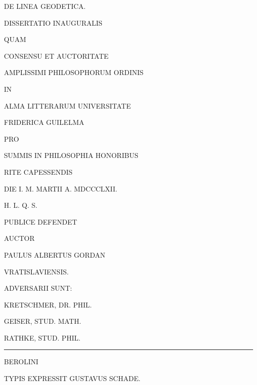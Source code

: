 \begin{titlepage}
\centering
{\LARGE DE LINEA GEODETICA.\par}\GordanOrnament
\vspace{1.4em}
{\large DISSERTATIO INAUGURALIS\par}
\vspace{0.6em}
QUAM\par
\vspace{0.6em}
CONSENSU ET AUCTORITATE\par
\vspace{0.6em}
AMPLISSIMI PHILOSOPHORUM ORDINIS\par
IN\par
ALMA LITTERARUM UNIVERSITATE\par
FRIDERICA GUILELMA\par
\vspace{0.6em}
PRO\par
\vspace{0.6em}
SUMMIS IN PHILOSOPHIA HONORIBUS\par
RITE CAPESSENDIS\par
\vspace{0.9em}
DIE I. M. MARTII A. MDCCCLXII.\par
H. L. Q. S.\par
\vspace{0.8em}
PUBLICE DEFENDET\par
\vspace{0.8em}
AUCTOR\par
\vspace{0.8em}
{\large PAULUS ALBERTUS GORDAN\par}
VRATISLAVIENSIS.\par
\vspace{1.2em}
ADVERSARII SUNT:\par
\vspace{0.5em}
KRETSCHMER, DR. PHIL.\par
GEISER, STUD. MATH.\par
RATHKE, STUD. PHIL.\par
\vfill\rule{0.72\textwidth}{0.35pt}\par\vspace{0.7em}
BEROLINI\par
TYPIS EXPRESSIT GUSTAVUS SCHADE.\par
\end{titlepage}
